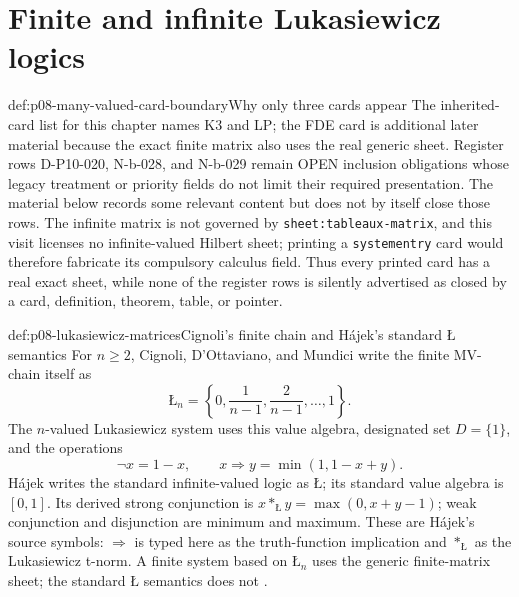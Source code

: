\section{Finite and infinite Lukasiewicz logics}

\begin{proofboundary}{def:p08-many-valued-card-boundary}{Why only three cards appear}
The inherited-card list for this chapter names K3 and LP; the FDE card is
additional later material because the exact finite matrix also uses the real
generic sheet.  Register rows D-P10-020, N-b-028, and N-b-029 remain OPEN
inclusion obligations whose legacy treatment or priority fields do not limit
their required presentation.  The material below records some relevant
content but does not by itself close those rows.  The infinite matrix is not governed by
\texttt{sheet:tableaux-matrix}, and this visit licenses no infinite-valued
Hilbert sheet; printing a \texttt{systementry} card would therefore fabricate
its compulsory calculus field.  Thus every printed card has a real exact
sheet, while none of the register rows is silently advertised as closed by a
card, definition, theorem, table, or pointer.
\end{proofboundary}

\begin{hbdefinition}{def:p08-lukasiewicz-matrices}{Cignoli's finite chain and H\'ajek's standard \(\text{\L}\) semantics}
For \(n\geq2\), Cignoli, D'Ottaviano, and Mundici write the finite
MV-chain itself as
\[
 \text{\L}_n=\left\{0,\frac1{n-1},\frac2{n-1},\ldots,1\right\}.
\]
The \(n\)-valued Lukasiewicz system uses this value algebra, designated set
\(D=\{1\}\), and the operations
\[
  \neg x=1-x,
  \qquad
  x\Rightarrow y=\min(1,1-x+y).
\]
H\'ajek writes the standard infinite-valued logic as \(\text{\L}\); its
standard value algebra is \([0,1]\).  Its derived strong conjunction is
\(x\mathbin{\ast_{\text{\L}}}y=\max(0,x+y-1)\); weak conjunction and
disjunction are minimum and maximum.  These are H\'ajek's source symbols:
\(\Rightarrow\) is typed here as the truth-function implication and
\(\ast_{\text{\L}}\) as the Lukasiewicz t-norm.  A finite system based on
\(\text{\L}_n\) uses
the generic finite-matrix sheet; the standard \(\text{\L}\) semantics does not
\cite{Lukasiewicz1920,LukasiewiczTarski1930,Hajek1998,
  CignoliDOttavianoMundici2000}.
\end{hbdefinition}

